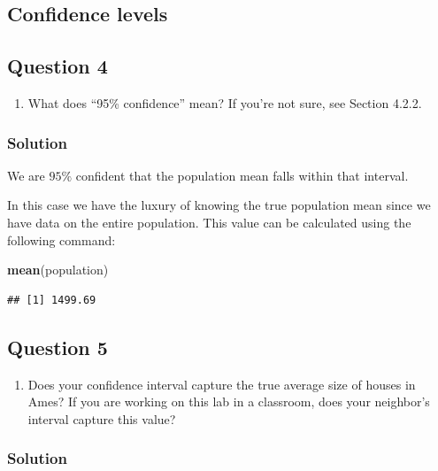 \documentclass[]{article}
\newenvironment{Shaded}{\begin{snugshade}}{\end{snugshade}}
\newcommand{\KeywordTok}[1]{\textcolor[rgb]{0.13,0.29,0.53}{\textbf{#1}}}
\newcommand{\NormalTok}[1]{#1}
\providecommand{\tightlist}{%
  \setlength{\itemsep}{0pt}\setlength{\parskip}{0pt}}
\begin{document}
\subsection{Confidence levels}\label{confidence-levels}

\subsection{Question 4}\label{question-4}

\begin{enumerate}
\def\labelenumi{\arabic{enumi}.}
\setcounter{enumi}{3}
\tightlist
\item
  What does ``95\% confidence'' mean? If you're not sure, see Section
  4.2.2.
\end{enumerate}

\subsubsection{Solution}\label{solution-3}

We are \(95\%\) confident that the population mean falls within that
interval.

In this case we have the luxury of knowing the true population mean
since we have data on the entire population. This value can be
calculated using the following command:

\begin{Shaded}
\begin{Highlighting}[]
\KeywordTok{mean}\NormalTok{(population)}
\end{Highlighting}
\end{Shaded}

\begin{verbatim}
## [1] 1499.69
\end{verbatim}

\subsection{Question 5}\label{question-5}

\begin{enumerate}
\def\labelenumi{\arabic{enumi}.}
\setcounter{enumi}{4}
\tightlist
\item
  Does your confidence interval capture the true average size of houses
  in Ames? If you are working on this lab in a classroom, does your
  neighbor's interval capture this value?
\end{enumerate}

\subsubsection{Solution}\label{solution-4}
\end{document}
